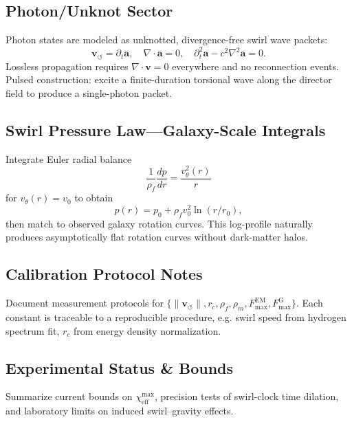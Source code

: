 \subsection{Photon/Unknot Sector}
\label{canon58:appE}
Photon states are modeled as unknotted, divergence-free swirl wave packets:
\[
    \mathbf{v}_{\!\boldsymbol{\circlearrowleft}} = \partial_t \mathbf{a}, \quad
    \nabla \cdot \mathbf{a} = 0, \quad
    \partial_t^{2}\mathbf{a} - c^{2}\nabla^{2}\mathbf{a} = 0.
\]
Lossless propagation requires $\nabla\cdot\mathbf{v}=0$ everywhere and
no reconnection events. Pulsed construction: excite a finite-duration
torsional wave along the director field to produce a single-photon packet.

\subsection{Swirl Pressure Law—Galaxy-Scale Integrals}
\label{canon58:appF}
Integrate Euler radial balance
\[
    \frac{1}{\rho_{\!f}}\frac{dp}{dr} = \frac{v_{\theta}^{2}(r)}{r}
\]
for $v_\theta(r)=v_0$ to obtain
\[
    p(r) = p_0 + \rho_{\!f} v_0^{2} \ln(r/r_0),
\]
then match to observed galaxy rotation curves. This log-profile naturally
produces asymptotically flat rotation curves without dark-matter halos.

\subsection{Calibration Protocol Notes}
\label{canon58:appG}
Document measurement protocols for
$\{\lVert \mathbf{v}_{\!\boldsymbol{\circlearrowleft}}\rVert, r_c, \rho_{\!f}, \rho_{\!m},
F_{\max}^{\mathrm{EM}}, F_{\max}^{\mathrm{G}}\}$.
Each constant is traceable to a reproducible procedure, e.g.
swirl speed from hydrogen spectrum fit, $r_c$ from energy density normalization.

\subsection{Experimental Status \& Bounds}
\label{canon58:appH}
Summarize current bounds on $\chi_{\mathrm{eff}}^{\max}$,
precision tests of swirl-clock time dilation,
and laboratory limits on induced swirl–gravity effects.

